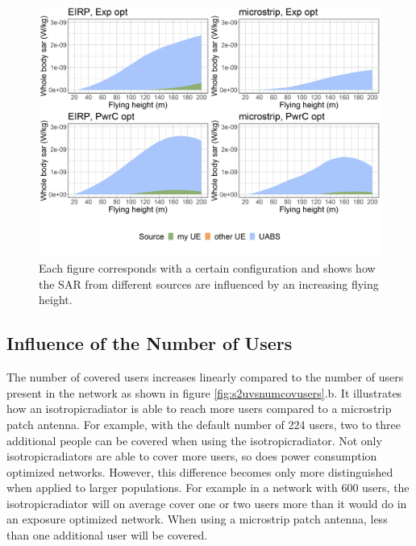 \begin{figure}[h!]
  \includegraphics[width=\textwidth]{../results/s2/fhFourSources.png}
  \caption{Each figure corresponds with a certain configuration and shows how the \acs{SAR} from 
  different sources are influenced by an increasing flying height.}
  \label{fig:s2shfourSourcesMatrix}
\end{figure}

\FloatBarrier
\subsection{Influence of the Number of Users}
\label{s2b}

The number of covered users increases linearly compared to the number of users present in the network as shown in figure 
\ref{fig:s2uvsnumcovusers}.b. It illustrates how an \gls{isotropicradiator} is able to reach more users 
compared to a microstrip patch antenna. For example, with the default number of 224 users, two to three additional 
people can be covered when using the \gls{isotropicradiator}.
Not only \gls{isotropicradiator}s are able to cover more users, so does power consumption optimized networks.
 However, this difference becomes only more distinguished when applied to larger populations. For example in a network
 with 600 users, the \gls{isotropicradiator}
 will on average cover one or two users more than it would do in an exposure optimized network. When using a microstrip patch 
 antenna, less than one additional user will be  covered.

